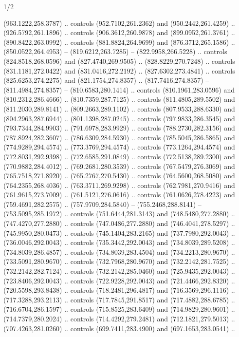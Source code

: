 \begin{flagdescription}{1/2}
\begin{scope}[shift={(2*\flaglength/3-0.25*\rb,0.51333\flagwidth)},scale=0.001715\flagwidth*\stretchfactor]
\begin{scope}[y=-1pt, x=1pt,cm={{1.04354,0.0,0.0,1.01818,(-827,-297)}}]
\begin{scope}[draw=black,line width=0.015\flagwidth]
\begin{scope}[fill=gold]
  (963.1222,258.3787) .. controls (952.7102,261.2362) and (950.2442,261.4259) ..
  (926.5792,261.1896) .. controls (906.3612,260.9878) and (899.0952,261.3761) ..
  (890.8422,263.0992) .. controls (881.8824,264.9699) and (876.3712,265.1586) ..
  (850.0522,264.4953) -- (819.6212,263.7285) -- (822.9958,266.5228) .. controls
  (824.8518,268.0596) and (827.4740,269.9505) .. (828.8229,270.7248) .. controls
  (831.1181,272.0422) and (831.0416,272.2192) .. (827.6302,273.4841) .. controls
  (825.6253,274.2275) and (821.1754,274.8357) .. (817.7416,274.8357) --
  (811.4984,274.8357) -- (810.6583,280.1414) .. controls (810.1961,283.0596) and
  (810.2312,286.4666) .. (810.7359,287.7125) .. controls (811.4805,289.5502) and
  (811.2030,289.8141) .. (809.2663,289.1102) .. controls (807.9533,288.6330) and
  (804.2963,287.6944) .. (801.1398,287.0245) .. controls (797.9833,286.3545) and
  (793.7344,284.9903) .. (791.6978,283.9929) .. controls (788.2730,282.3156) and
  (787.8924,282.3607) .. (786.6309,284.5930) .. controls (785.5045,286.5865) and
  (774.9289,294.4574) .. (773.3769,294.4574) .. controls (773.1264,294.4574) and
  (772.8031,292.9398) .. (772.6585,291.0849) .. controls (772.5138,289.2300) and
  (770.9882,284.4012) .. (769.2681,280.3539) .. controls (767.5479,276.3069) and
  (765.7518,271.8920) .. (765.2767,270.5430) .. controls (764.5600,268.5080) and
  (764.2355,268.4036) .. (763.3711,269.9298) .. controls (762.7981,270.9416) and
  (761.9615,273.7009) .. (761.5121,276.0616) .. controls (761.0626,278.4223) and
  (759.4691,282.2575) .. (757.9709,284.5840) -- (755.2468,288.8141) --
  (753.5095,285.1972) .. controls (751.6444,281.3143) and (748.5480,277.2880) ..
  (747.4270,277.2880) .. controls (747.0486,277.2880) and (746.4041,278.5297) ..
  (745.9950,280.0473) .. controls (745.1404,283.2165) and (737.7980,292.0043) ..
  (736.0046,292.0043) .. controls (735.3442,292.0043) and (734.8039,289.5208) ..
  (734.8039,286.4857) .. controls (734.8039,283.4504) and (734.2213,280.9670) ..
  (733.5091,280.9670) .. controls (732.7968,280.9670) and (732.2142,281.7525) ..
  (732.2142,282.7124) .. controls (732.2142,285.0460) and (725.9435,292.0043) ..
  (723.8406,292.0043) .. controls (722.9228,292.0043) and (721.4466,292.8320) ..
  (720.5598,293.8438) .. controls (718.2481,296.4817) and (716.3569,296.1116) ..
  (717.3288,293.2113) .. controls (717.7845,291.8517) and (717.4882,288.6785) ..
  (716.6704,286.1597) .. controls (715.8525,283.6409) and (714.9829,280.9601) ..
  (714.7379,280.2024) .. controls (714.4292,279.2481) and (712.1821,279.5013) ..
  (707.4263,281.0260) .. controls (699.7411,283.4900) and (697.1653,283.0541) ..

\end{scope}
\end{scope}
\end{scope}
\end{scope}
\end{flagdescription}
